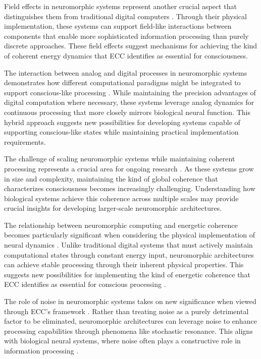 \begin{refsection}
Field effects in neuromorphic systems represent another crucial aspect that distinguishes them from traditional digital computers \cite{Indiveri2020}. Through their physical implementation, these systems can support field-like interactions between components that enable more sophisticated information processing than purely discrete approaches. These field effects suggest mechanisms for achieving the kind of coherent energy dynamics that ECC identifies as essential for consciousness.

The interaction between analog and digital processes in neuromorphic systems demonstrates how different computational paradigms might be integrated to support conscious-like processing \cite{Markovic2020}. While maintaining the precision advantages of digital computation where necessary, these systems leverage analog dynamics for continuous processing that more closely mirrors biological neural function. This hybrid approach suggests new possibilities for developing systems capable of supporting conscious-like states while maintaining practical implementation requirements.

The challenge of scaling neuromorphic systems while maintaining coherent processing represents a crucial area for ongoing research \cite{Merolla2019}. As these systems grow in size and complexity, maintaining the kind of global coherence that characterizes consciousness becomes increasingly challenging. Understanding how biological systems achieve this coherence across multiple scales may provide crucial insights for developing larger-scale neuromorphic architectures.

The relationship between neuromorphic computing and energetic coherence becomes particularly significant when considering the physical implementation of neural dynamics \cite{Neftci2019}. Unlike traditional digital systems that must actively maintain computational states through constant energy input, neuromorphic architectures can achieve stable processing through their inherent physical properties. This suggests new possibilities for implementing the kind of energetic coherence that ECC identifies as essential for conscious processing \cite{Roy2019}.

The role of noise in neuromorphic systems takes on new significance when viewed through ECC's framework \cite{Schuman2021}. Rather than treating noise as a purely detrimental factor to be eliminated, neuromorphic architectures can leverage noise to enhance processing capabilities through phenomena like stochastic resonance. This aligns with biological neural systems, where noise often plays a constructive role in information processing \cite{Sebastian2020}.


\end{refsection}
